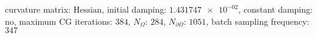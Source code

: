curvature matrix: $\text{Hessian}$, initial damping: $\num[scientific-notation=true]{1.431747e-02}$, constant damping: $\text{no}$, maximum CG iterations: $\num[scientific-notation=false]{384}$, $N_{\Omega}$: $\num[scientific-notation=false]{284}$, $N_{\partial\Omega}$: $\num[scientific-notation=false]{1051}$, batch sampling frequency: $\num[scientific-notation=false]{347}$